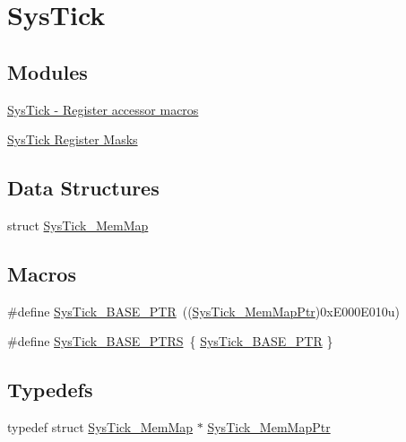 \hypertarget{group___sys_tick___peripheral}{}\section{Sys\+Tick}
\label{group___sys_tick___peripheral}
\subsection*{Modules}
\begin{DoxyCompactItemize}
\item 
\hyperlink{group___sys_tick___register___accessor___macros}{Sys\+Tick -\/ Register accessor macros}
\item 
\hyperlink{group___sys_tick___register___masks}{Sys\+Tick Register Masks}
\end{DoxyCompactItemize}
\subsection*{Data Structures}
\begin{DoxyCompactItemize}
\item 
struct \hyperlink{struct_sys_tick___mem_map}{Sys\+Tick\+\_\+\+Mem\+Map}
\end{DoxyCompactItemize}
\subsection*{Macros}
\begin{DoxyCompactItemize}
\item 
\#define \hyperlink{group___sys_tick___peripheral_gaeef73642fdef722ce658e468dad877ea}{Sys\+Tick\+\_\+\+B\+A\+S\+E\+\_\+\+P\+TR}~((\hyperlink{group___sys_tick___peripheral_ga19e2a0c9400dcdfd462a92ca83cff253}{Sys\+Tick\+\_\+\+Mem\+Map\+Ptr})0x\+E000\+E010u)
\item 
\#define \hyperlink{group___sys_tick___peripheral_ga0c9d5fa2fdb81e177e61d0e980507c51}{Sys\+Tick\+\_\+\+B\+A\+S\+E\+\_\+\+P\+T\+RS}~\{ \hyperlink{group___sys_tick___peripheral_gaeef73642fdef722ce658e468dad877ea}{Sys\+Tick\+\_\+\+B\+A\+S\+E\+\_\+\+P\+TR} \}
\end{DoxyCompactItemize}
\subsection*{Typedefs}
\begin{DoxyCompactItemize}
\item 
typedef struct \hyperlink{struct_sys_tick___mem_map}{Sys\+Tick\+\_\+\+Mem\+Map} $\ast$ \hyperlink{group___sys_tick___peripheral_ga19e2a0c9400dcdfd462a92ca83cff253}{Sys\+Tick\+\_\+\+Mem\+Map\+Ptr}
\end{DoxyCompactItemize}


